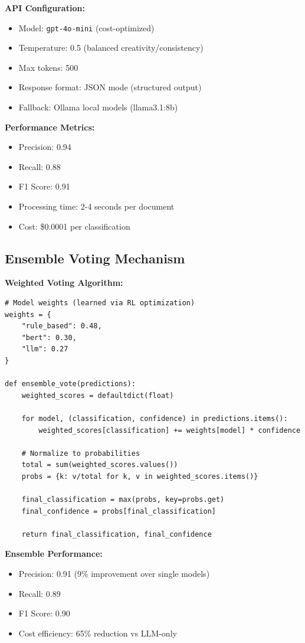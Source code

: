 \textbf{API Configuration:}
\begin{itemize}
    \item Model: \texttt{gpt-4o-mini} (cost-optimized)
    \item Temperature: 0.5 (balanced creativity/consistency)
    \item Max tokens: 500
    \item Response format: JSON mode (structured output)
    \item Fallback: Ollama local models (llama3.1:8b)
\end{itemize}

\textbf{Performance Metrics:}
\begin{itemize}
    \item Precision: 0.94
    \item Recall: 0.88
    \item F1 Score: 0.91
    \item Processing time: 2-4 seconds per document
    \item Cost: \$0.0001 per classification
\end{itemize}

\subsection{Ensemble Voting Mechanism}

\textbf{Weighted Voting Algorithm:}

\begin{lstlisting}[style=pythonstyle]
# Model weights (learned via RL optimization)
weights = {
    "rule_based": 0.48,
    "bert": 0.30,
    "llm": 0.27
}

def ensemble_vote(predictions):
    weighted_scores = defaultdict(float)
    
    for model, (classification, confidence) in predictions.items():
        weighted_scores[classification] += weights[model] * confidence
    
    # Normalize to probabilities
    total = sum(weighted_scores.values())
    probs = {k: v/total for k, v in weighted_scores.items()}
    
    final_classification = max(probs, key=probs.get)
    final_confidence = probs[final_classification]
    
    return final_classification, final_confidence
\end{lstlisting}

\textbf{Ensemble Performance:}
\begin{itemize}
    \item Precision: 0.91 (9\% improvement over single models)
    \item Recall: 0.89
    \item F1 Score: 0.90
    \item Cost efficiency: 65\% reduction vs LLM-only
\end{itemize}

